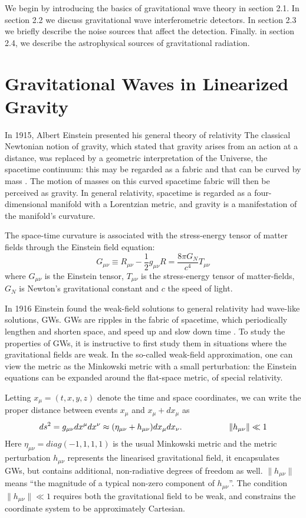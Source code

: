 \documentclass[binding=0.6cm, LaM]{sapthesis}
\begin{document}
	We begin by introducing the basics of gravitational wave theory in section 2.1. 
	In section 2.2 we discuss gravitational wave interferometric detectors. 
	In section 2.3 we briefly describe the noise sources that affect the detection. 
	Finally. in section 2.4, we describe the astrophysical sources of gravitational radiation.

\section{Gravitational Waves in Linearized Gravity}

	In 1915, Albert Einstein presented his general theory of relativity
	The classical Newtonian notion of gravity, which stated that gravity arises from an 
	action at a distance, was replaced by a geometric interpretation of the Universe, 
	the spacetime continuum: this may be regarded as a fabric and that can be curved 
	by mass \cite{1}. 
	The motion of masses on this curved spacetime fabric will then be perceived as gravity. 
	In general relativity, spacetime is regarded as a four-dimensional manifold 
	with a Lorentzian metric, and gravity is a manifestation of the manifold’s curvature.

	The space-time curvature is associated with the stress-energy tensor 
	of matter fields through the Einstein field equation:
		\begin{equation}
		G_{\mu\nu} \equiv R_{\mu\nu}  - {\frac{1}{2}}g_{\mu\nu}R = \frac{8\pi G_{N}}{c^4}T_{\mu\nu} 
		\end{equation}
	where $G_{\mu\nu} $ is the Einstein tensor, $T_{\mu\nu} $ is the stress-energy 
	tensor of matter-fields, $ G_{N}$ is Newton’s gravitational constant and $c$ the speed of light.

	In 1916 Einstein found the weak-field solutions to general relativity had wave-like solutions, GWs.
	GWs are ripples in the fabric of spacetime, 
	which periodically lengthen and shorten space, and speed up and slow down time \cite{2}.
 	To study the properties of GWs, it is instructive to first study them 
	in situations where the gravitational fields are weak.
	In the so-called weak-field approximation, one can view the metric as the Minkowski metric 
	with a small perturbation: the Einstein equations can be expanded around the flat-space metric, of special relativity.

	Letting $ x_\mu = (t, x, y, z)$ denote the time and space coordinates, 
	we can write the proper distance between events $x_{\mu}$ and $x_{\mu} + dx_{\mu}$ as
		\[
		ds^2 = g_{\mu\nu}dx^{\mu}dx^{\nu} \approx (\eta_{\mu\nu} + h_{\mu\nu})dx_{\mu}dx_{\nu}. \hspace*{2cm}\|h_{\mu\nu}\|\ll 1
		\]
	Here $\eta_{\mu\nu} = diag(-1,1,1,1)$ is the usual Minkowski metric and the metric perturbation  $h_{\mu\nu}$
	represents the linearised gravitational field, it encapsulates GWs, 
	but contains additional, non-radiative degrees of freedom as well. $\|h_{\mu\nu}\|$ means
	“the magnitude of a typical non-zero component of $h_{\mu\nu}$”. 
	The condition $\|h_{\mu\nu}\|\ll 1$ requires both the gravitational field to be weak, 
	and constrains the coordinate system to be approximately Cartesian.
\end{document}
